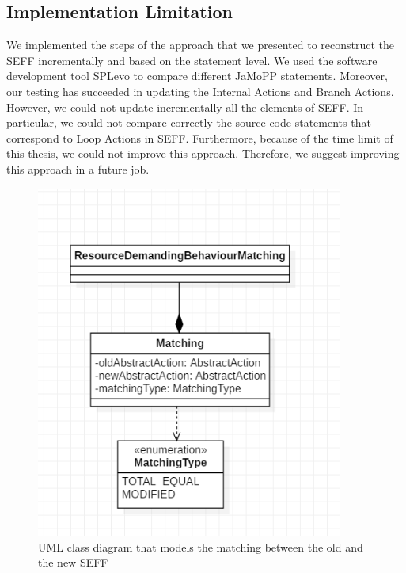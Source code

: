 \subsection{Implementation Limitation}
\label{sec:Implementation Limitation}

We implemented the steps of the approach that we presented to reconstruct the SEFF incrementally and based on the statement level. We used the software development tool SPLevo \cite{klatt2016consolidation} to compare different JaMoPP statements. Moreover, our testing has succeeded in updating the Internal Actions and Branch Actions. However, we could not update incrementally all the elements of SEFF. In particular, we could not compare correctly the source code statements that correspond to Loop Actions in SEFF. Furthermore, because of the time limit of this thesis, we could not improve this approach. Therefore, we suggest improving this approach in a future job.   



\begin{figure}[h]
\centering
\includegraphics[width=0.9\textwidth]{figures/seffmachting}
\caption{UML class diagram that models the matching between the old and the new SEFF}
\label{fig:seffmachting}
\end{figure}




